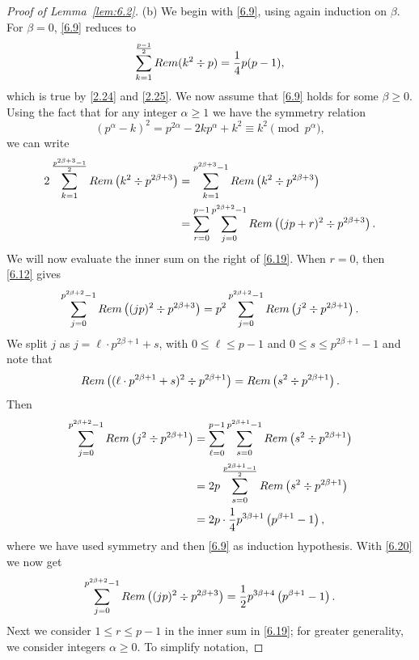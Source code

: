 \documentclass[10pt,a4paper]{amsart}
\begin{document}
\begin{proof}[Proof of Lemma~\ref{lem:6.2}]
(b) We begin with \eqref{6.9}, using again induction on $\beta$. For $\beta=0$,
\eqref{6.9} reduces to 
\begin{equation}\label{6.18a}
\sum_{k=1}^{\frac{p-1}{2}}{\rm Rem}(k^2\div p)=\frac{1}{4}p(p-1),
\end{equation}
which is true by \eqref{2.24} and \eqref{2.25}. We now assume that \eqref{6.9}
holds for some $\beta\geq 0$. Using the fact that for any integer $\alpha\geq 1$
we have the symmetry relation
\[
\left(p^{\alpha}-k\right)^2 = p^{2\alpha}-2kp^{\alpha}+k^2
\equiv k^2\pmod{p^{\alpha}},
\]
we can write
\begin{align}
2\sum_{k=1}^{\frac{p^{2\beta+3}-1}{2}}{\rm Rem}\left(k^2\div p^{2\beta+3}\right)
&=\sum_{k=1}^{p^{2\beta+3}-1}{\rm Rem}\left(k^2\div p^{2\beta+3}\right)\label{6.19}\\
&=\sum_{r=0}^{p-1}\sum_{j=0}^{p^{2\beta+2}-1}
{\rm Rem}\left((jp+r)^2\div p^{2\beta+3}\right).\nonumber
\end{align}
We will now evaluate the inner sum on the right of \eqref{6.19}. When $r=0$,
then \eqref{6.12} gives
\begin{equation}\label{6.20}
\sum_{j=0}^{p^{2\beta+2}-1}{\rm Rem}\left((jp)^2\div p^{2\beta+3}\right)
=p^2\sum_{j=0}^{p^{2\beta+2}-1}{\rm Rem}\left(j^2\div p^{2\beta+1}\right).
\end{equation}
We split $j$ as $j=\ell\cdot p^{2\beta+1}+s$, with $0\leq\ell\leq p-1$ and
$0\leq s\leq p^{2\beta+1}-1$ and note that
\[
{\rm Rem}\left((\ell\cdot p^{2\beta+1}+s)^2\div p^{2\beta+1}\right)
={\rm Rem}\left(s^2\div p^{2\beta+1}\right).
\]
Then
\begin{align*}
\sum_{j=0}^{p^{2\beta+2}-1}{\rm Rem}\left(j^2\div p^{2\beta+1}\right)
&=\sum_{\ell=0}^{p-1}\sum_{s=0}^{p^{2\beta+1}-1}
{\rm Rem}\left(s^2\div p^{2\beta+1}\right) \\
&=2p\sum_{s=0}^{\frac{p^{2\beta+1}-1}{2}}
{\rm Rem}\left(s^2\div p^{2\beta+1}\right) \\
&= 2p\cdot\frac{1}{4}p^{3\beta+1}\left(p^{\beta+1}-1\right),
\end{align*}
where we have used symmetry and then \eqref{6.9} as induction hypothesis.
With \eqref{6.20} we now get
\begin{equation}\label{6.21}
\sum_{j=0}^{p^{2\beta+2}-1}{\rm Rem}\left((jp)^2\div p^{2\beta+3}\right)
= \frac{1}{2}p^{3\beta+4}\left(p^{\beta+1}-1\right).
\end{equation}
Next we consider $1\leq r\leq p-1$ in the inner sum in \eqref{6.19}; for 
greater generality, we consider integers $\alpha\geq 0$. To simplify notation,

\end{proof}
\end{document}
